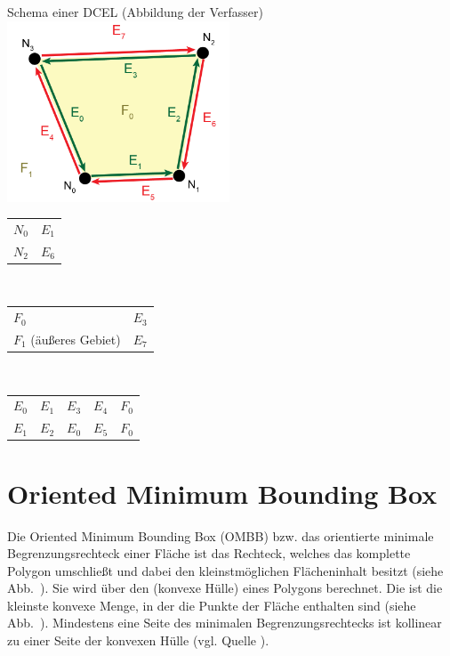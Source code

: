 \begin{Bild}{Schema einer DCEL (Abbildung der Verfasser)}
	\includegraphics[width=250px]{Bilder/DCEL-10}
\end{Bild}

\begin{tabularx}{\textwidth}{|Y|Y|}
	\hline
	 &  \\
	\hline
	$N_0$ & $E_1$ \\
	\hline
	$N_2$ & $E_6$ \\
	\hline
\end{tabularx}\\\vspace{12px}

\begin{tabularx}{\textwidth}{|Y|Y|}
	\hline
	 &  \\
	\hline
	$F_0$ & $E_3$ \\
	\hline
	$F_1$ (äußeres Gebiet) & $E_7$ \\
	\hline
\end{tabularx}\\

\begin{tabularx}{\textwidth}{|Y|Y|Y|Y|Y|}
	\hline
	 &  &  &  &  \\
	\hline
	$E_0$ & $E_1$ & $E_3$& $E_4$& $F_0$ \\
	\hline
	$E_1$ & $E_2$ & $E_0$& $E_5$& $F_0$ \\
	\hline
\end{tabularx}

\section{Oriented Minimum Bounding Box}
Die Oriented Minimum Bounding Box (OMBB) bzw. das orientierte minimale Begrenzungsrechteck einer Fläche ist das Rechteck, welches das komplette Polygon umschließt und dabei den kleinstmöglichen Flächeninhalt besitzt (siehe Abb.~\thebildnrnext).
Sie wird über den  (konvexe Hülle) eines Polygons berechnet.
Die  ist die kleinste konvexe Menge, in der die Punkte der Fläche enthalten sind (siehe Abb.~\thebildnrnext).
Mindestens eine Seite des minimalen Begrenzungsrechtecks ist kollinear zu einer Seite der konvexen Hülle (vgl. Quelle \cite{ombb}).

